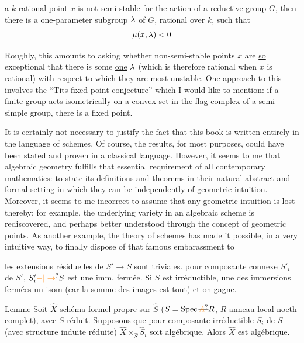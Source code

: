a $k$-rational point $x$ is not semi-stable for the action of a reductive group $G$, then there is a one-parameter subgroup $\lambda$ of $G$, rational over $k$, such that
\[
\mu(x,\lambda)<0
\]

Roughly, this amounts to asking whether non-semi-stable points $x$ are \uline{so} exceptional that there is some \uline{one} $\lambda$ (which is therefore rational when $x$ is rational) with respect to which they are most unstable. One approach to this involves the ``Tits fixed point conjecture'' which I would like to mention: if a finite group acts isometrically on a convex set in the flag complex of a semi-simple group, there is a fixed point.

It is certainly not necessary to justify the fact that this book is written entirely in the language of schemes. Of course, the results, for most purposes, could have been stated and proven in a classical language. However, it seems to me  that algebraic geometry fulfills
that essential requirement of all contemporary mathematics: to state its definitions and theorems in their natural abstract and formal setting in which they can be  independently of geometric intuition. Moreover, it seems to me incorrect to assume that any geometric intuition is lost thereby: for example, the underlying variety in an algebraic scheme is rediscovered, and perhaps better understood through the concept of geometric points. As another example, the theory of schemes has made it possible, in a very intuitive way, to finally dispose of that famous embarassment to

les extensions résiduelles de $S'\to S$ sont triviales.   pour  composante connexe $S'_i$ de $S'$, $S'_i\unsure{-|\to}S$ est une imm.  fermée. Si $S$ est irréductible, une des immersions fermées  un isom (car la somme des images est tout) et on gagne.  

\uline{Lemme} Soit $\widehat X$ schéma formel propre sur $\widehat S$ ($S=\operatorname{Spec}\deleted{\unsure{A}}R$, $R$ anneau local noeth complet), avec $S$ réduit. Supposons que pour  composante irréductible $S_i$ de $S$ (avec structure induite réduite) $\widehat X\times_{\widehat S}\widehat S_i$ soit algébrique. Alors $\widehat X$ est algébrique.

